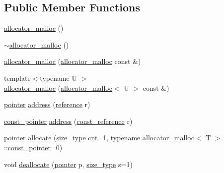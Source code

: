 \subsection*{Public Member Functions}
\begin{DoxyCompactItemize}
\item 
\hyperlink{classcrap_1_1allocator__malloc_a5d31c3f02fa94f4e8e7f1dedff679dba}{allocator\-\_\-malloc} ()
\item 
\hyperlink{classcrap_1_1allocator__malloc_a0da8a9a3ce6f609385e4e566f9e4379c}{$\sim$allocator\-\_\-malloc} ()
\item 
\hyperlink{classcrap_1_1allocator__malloc_a1dfaa4a6c75d62cb44223b1477c00b11}{allocator\-\_\-malloc} (\hyperlink{classcrap_1_1allocator__malloc}{allocator\-\_\-malloc} const \&)
\item 
{\footnotesize template$<$typename U $>$ }\\\hyperlink{classcrap_1_1allocator__malloc_a6a674cd895a54b979f5bddfd438468f4}{allocator\-\_\-malloc} (\hyperlink{classcrap_1_1allocator__malloc}{allocator\-\_\-malloc}$<$ U $>$ const \&)
\item 
\hyperlink{classcrap_1_1allocator__malloc_a2bc7f3c9513f482c998d0241fff499a4}{pointer} \hyperlink{classcrap_1_1allocator__malloc_a28850adf174a56b8e6bf0a11f7427cdd}{address} (\hyperlink{classcrap_1_1allocator__malloc_a8b7fbb7f3ec9ce7edac2c9e544739a98}{reference} r)
\item 
\hyperlink{classcrap_1_1allocator__malloc_acdfb7a73142fadd4d2da1260a41e0c8b}{const\-\_\-pointer} \hyperlink{classcrap_1_1allocator__malloc_a17ee58065ffcb5f75363b4e8a6dd0eab}{address} (\hyperlink{classcrap_1_1allocator__malloc_ab8c48878eb30f1a5ffc7e7f55177731e}{const\-\_\-reference} r)
\item 
\hyperlink{classcrap_1_1allocator__malloc_a2bc7f3c9513f482c998d0241fff499a4}{pointer} \hyperlink{classcrap_1_1allocator__malloc_a3c6f94a6b78abe212605b2064ffa493e}{allocate} (\hyperlink{classcrap_1_1allocator__malloc_ad32425bf529526a4335179cc55a79a83}{size\-\_\-type} cnt=1, typename \hyperlink{classcrap_1_1allocator__malloc}{allocator\-\_\-malloc}$<$ T $>$\-::\hyperlink{classcrap_1_1allocator__malloc_acdfb7a73142fadd4d2da1260a41e0c8b}{const\-\_\-pointer}=0)
\item 
void \hyperlink{classcrap_1_1allocator__malloc_a21740e4124cf55d46dc28ad95bd2af6d}{deallocate} (\hyperlink{classcrap_1_1allocator__malloc_a2bc7f3c9513f482c998d0241fff499a4}{pointer} p, \hyperlink{classcrap_1_1allocator__malloc_ad32425bf529526a4335179cc55a79a83}{size\-\_\-type} s=1)
\item 

\end{DoxyCompactItemize}
